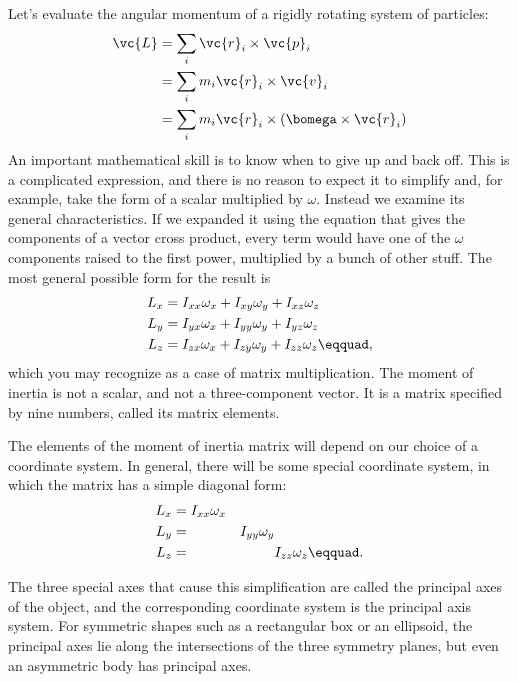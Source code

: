 Let's evaluate the angular momentum of a rigidly rotating
system of particles:
\begin{align*}
        \vc{L}        &= \sum_i \vc{r}_i \times \vc{p}_i \\
                        &= \sum_i m_i \vc{r}_i \times \vc{v}_i \\
                        &= \sum_i m_i \vc{r}_i \times (\bomega \times \vc{r}_i)
\end{align*}
An important mathematical skill is to know when to give up
and back off. This is a complicated expression, and there is
no reason to expect it to simplify and, for example, take
the form of a scalar multiplied by $\omega$. Instead we examine its
general characteristics. If we expanded it using the
equation that gives the components of a vector cross
product, every term would have one of the $\omega$ components
raised to the first power, multiplied by a bunch of other
stuff. The most general possible form for the result
is
\begin{align*}
                L_x        &=  I_{xx}\omega_x + I_{xy}\omega_y + I_{xz}\omega_z\\
                L_y        &=  I_{yx}\omega_x + I_{yy}\omega_y + I_{yz}\omega_z\\
                L_z        &=  I_{zx}\omega_x + I_{zy}\omega_y + I_{zz}\omega_z\eqquad,
\end{align*}
which you may recognize as a case of matrix multiplication.
The moment of inertia is not a scalar, and not a
three-component vector. It is a matrix specified by nine
numbers, called its matrix elements.

The elements of the moment of inertia matrix will depend on
our choice of a coordinate system. In general, there will be
some special coordinate system, in which the matrix has a
simple diagonal form:
\begin{alignat*}{2}
        L_x        &=  I_{xx}\omega_x & & \\
        L_y        &=   & I_{yy}\omega_y & \\
        L_z        &=  & & I_{zz}\omega_z\eqquad.
\end{alignat*}

The three special axes that cause this simplification are
called the principal axes of the object, and the
corresponding coordinate system is the principal axis
system. For symmetric shapes such as a rectangular box or an
ellipsoid, the principal axes lie along the intersections of
the three symmetry planes, but even an asymmetric body has
principal axes.

